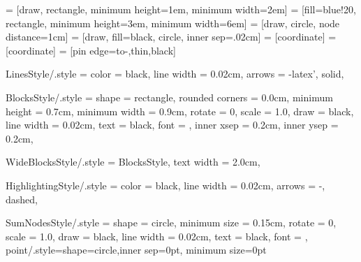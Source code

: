 \usepackage{tikz}
\usepackage{pgfplots}
\usetikzlibrary{shapes,arrows}
\usetikzlibrary{arrows,arrows.new}
\usetikzlibrary{snakes}

\usetikzlibrary{decorations.pathmorphing}


 = [draw, rectangle,
    minimum height=1em, minimum width=2em]
 = [fill=blue!20, rectangle,
    minimum height=3em, minimum width=6em]
 = [draw, circle, node distance=1cm]
 = [draw, fill=black, circle, inner sep=.02cm]
 = [coordinate]
 = [coordinate]
 = [pin edge={to-,thin,black}]

\tikzset
{
	LinesStyle/.style =
	{
		color				= black,	%
		line width			= 0.02cm,			%
		arrows				= -latex',			%
		solid,
	}
}	%

\tikzset
{
	BlocksStyle/.style =
	{
		shape			= rectangle,			%
		rounded corners	= 0.0cm,				%
		minimum height	= 0.7cm,				%
		minimum width	= 0.9cm,				%
		rotate			= 0,					%
		scale			= 1.0,					%
		draw			= black,				%
		line width		= 0.02cm,				%
		text			= black,				%
		font			= \normalsize\normalfont,	%
		inner xsep		= 0.2cm,				%
		inner ysep		= 0.2cm,				%
	}
}

\tikzset
{
	WideBlocksStyle/.style =
	{
		BlocksStyle,
		text width		= 2.0cm,				%
	}
}

\tikzset
{
	HighlightingStyle/.style =
	{
		color				= black,	%
		line width			= 0.02cm,			%
		arrows				= -,				%
		dashed,
	}
}

\tikzset
{
	SumNodesStyle/.style =
	{
		shape			= circle,				%
		minimum size	= 0.15cm,				%
		rotate			= 0,					%
		scale			= 1.0,					%
		draw			= black,				%
		line width		= 0.02cm,				%
		text			= black,				%
		font			= \normalsize\normalfont,	%
	}
}
\tikzset
{
    point/.style={shape=circle,inner sep=0pt, minimum size=0pt}
}


